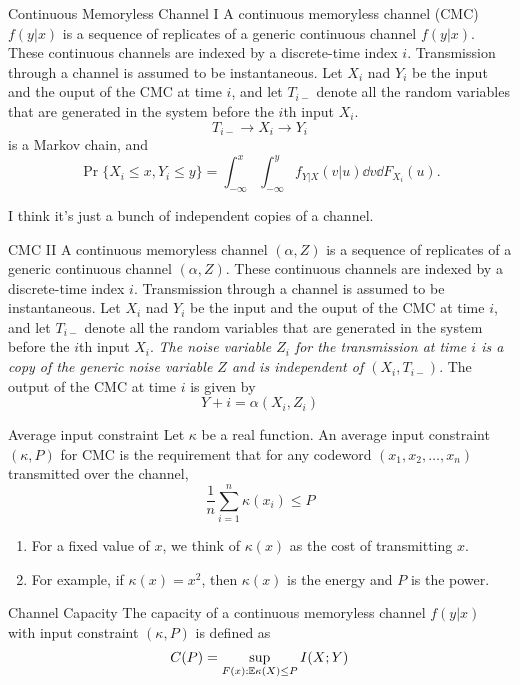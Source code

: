 \documentclass[../main.tex]{subfiles}
\begin{document}
\begin{gbox}{Continuous Memoryless Channel I}
    A continuous memoryless channel (CMC) $f(y|x)$ is a sequence of replicates of a generic continuous channel $f(y|x)$. These continuous channels are indexed by a discrete-time index $i$. Transmission through a channel is assumed to be instantaneous. Let $X_i$ nad $Y_i$ be the input and the ouput of the CMC at time $i$, and let $T_{i-}$ denote all the random variables that are generated in the system before the $i$th input $X_i$. \[
    T_{i-}\to X_i\to Y_i
    \] is a Markov chain, and \[
    \Pr\{X_i\leq x, Y_i\leq y\}= \int_{-\infty}^x\int_{-\infty}^y f_{Y|X}(v|u)\dd v\dd F_{X_i}(u).
    \]
    \begin{remark}
        I think it's just a bunch of independent copies of a channel.
    \end{remark}
\end{gbox}
\begin{gbox}{CMC II}
    A continuous memoryless channel $(\alpha,Z)$ is a sequence of replicates of a generic continuous channel $(\alpha,Z)$. These continuous channels are indexed by a discrete-time index $i$. Transmission through a channel is assumed to be instantaneous. Let $X_i$ nad $Y_i$ be the input and the ouput of the CMC at time $i$, and let $T_{i-}$ denote all the random variables that are generated in the system before the $i$th input $X_i$. \textit{The noise variable $Z_i$ for the transmission at time $i$ is a copy of the generic noise variable $Z$ and is independent of $(X_i, T_{i-})$}. The output of the CMC at time $i$ is given by \[
    Y+i = \alpha(X_i,Z_i)
    \]
\end{gbox}
\begin{gbox}{Average input constraint}
    Let $\kappa$ be a real function. An average input constraint $(\kappa, P)$ for CMC is the requirement that for any codeword $(x_1,x_2,\dots,x_n)$ transmitted over the channel, \[
    \frac{1}{n}\sum_{i=1}^n \kappa(x_i) \leq P
    \]
    \begin{enumerate}
        \item For a fixed value of $x$, we think of $\kappa(x)$ as the cost of transmitting $x$.
        \item For example, if $\kappa(x)=x^2$, then $\kappa(x)$ is the energy and $P$ is the power.
    \end{enumerate}
\end{gbox}
\begin{gbox}{Channel Capacity}
    The capacity of a continuous memoryless channel $f(y|x)$ with input constraint $(\kappa, P)$ is defined as \[
    C(P) = \sup_{F(x): \mathbb{E}\kappa(X)\leq P} I(X;Y)
    \]
\end{gbox}
\end{document}
